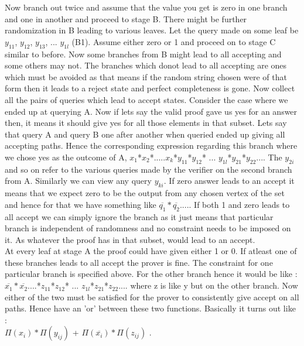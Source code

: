 \documentclass[12pt]{exam}
\begin{document}
\begin{questions}
\begin{solution}
Now branch out twice and assume that the value
you get is zero in one branch and one in another and proceed to stage B.
There might be further randomization in B leading to various leaves.
Let the query made on some leaf be $y_{11}$, $y_{12}$, $y_{13}$, ... $y_{1l}$ (B1).
Assume either zero or 1 and proceed on to stage C similar to before.
Now some branches from B might lead to all accepting
and some others may not. The branches which donot lead to all accepting are
ones which must be avoided as that means if the random string chosen were of that
form then it leads to a reject state and perfect completeness is gone. Now
collect all the pairs of queries which lead to accept states. Consider the
case where we ended up at querying A. Now if lets say the valid proof gave
us yes for an answer then, it means it should give yes for all those elements in that
subset. Lets say that query A and query B one after another when queried ended
up giving all accepting paths. Hence the corresponding expression
regarding this branch where we chose yes as the outcome of A,
$x_1$*$x_2$*.....$x_k$*$y_{11}$*$y_{12}$* ... $y_{1l}$*$y_{21}$*$y_{22}$....
The $y_{2i}$ and so on refer to the various queries made by the verifier
on the second branch from A. Similarly we can view any query $y_{ki}$. If zero answer
leads to an accept it means that we expect zero to be the output from
any chosen vertex of the set and hence for that we have something like
$\overline{q_1}*\overline{q_2}....$. If both 1 and zero leads to all accept
we can simply ignore the branch as it just means that particular branch
is independent of randomness and no constraint needs to be imposed on it.
As whatever the proof has in that subset, would lead to an accept.\\

At every leaf at stage A the proof
could have given either 1 or 0. If atleast one of these branches leads
to all accept the prover is fine. The constraint for one particular
branch is specified above. For the other branch hence it would be like :\\
$\overline{x_1}*\overline{x_2}....$*$z_{11}$*$z_{12}$* ... $z_{1l}$*$z_{21}$*$z_{22}$....
where z is like y but on the other branch. Now either of the two must be satisfied
for the prover to consistently give accept on all paths. Hence have an 'or' between
these two functions. Basically it turns out like :\\
$\Pi (x_i) * \Pi (y_{ij})$ + $\Pi (\overline{x_i}) * \Pi (z_{ij})$
.\\


\end{solution}
\end{questions}
\end{document}
